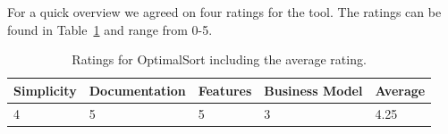 For a quick overview we agreed on four ratings for the tool. The ratings can be
found in Table~\ref{tab:rating-OptimalSort} and range from 0-5.

\begin{table}[tp] 
\centering 
\begin{tabularx}{\linewidth}{|X|X|X|X|X|}
\hline
Simplicity & Documentation & Features & Business Model & Average \\ 
\hline 
4 & 5 & 5 & 3 & 4.25 \\ 
\hline 
\end{tabularx} 
\caption[Ratings for OptimalSort] {
Ratings for OptimalSort including the average rating.
} 
\label{tab:rating-OptimalSort}
\end{table}






